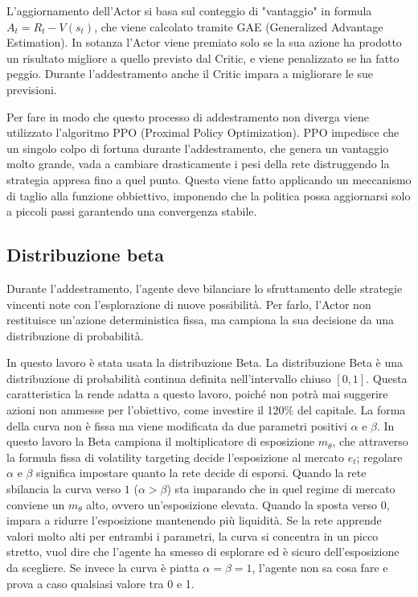 L'aggiornamento dell'Actor si basa sul conteggio di "vantaggio" in formula $A_t = R_t - V(s_t)$, che viene calcolato tramite GAE (Generalized Advantage Estimation).
In sotanza l'Actor viene premiato solo se la sua azione ha prodotto un risultato migliore a quello previsto dal Critic, e viene penalizzato se ha fatto peggio.
Durante l'addestramento anche il Critic impara a migliorare le sue previsioni.

Per fare in modo che questo processo di addestramento non diverga viene utilizzato l'algoritmo PPO (Proximal Policy Optimization). 
PPO impedisce che un singolo colpo di fortuna durante l'addestramento, che genera un vantaggio molto grande, vada a cambiare drasticamente i pesi della rete distruggendo la strategia appresa fino a quel punto.
Questo viene fatto applicando un meccanismo di taglio alla funzione obbiettivo, imponendo che la politica possa aggiornarsi solo a piccoli passi garantendo una convergenza stabile.

\subsection{Distribuzione beta}
Durante l'addestramento, l'agente deve bilanciare lo sfruttamento delle strategie vincenti note con l'esplorazione di nuove possibilità. Per farlo, l'Actor non restituisce un'azione deterministica fissa, ma campiona la sua decisione da una distribuzione di probabilità. 

In questo lavoro è stata usata la distribuzione Beta.
La distribuzione Beta è una distribuzione di probabilità continua definita nell'intervallo chiuso $[0,1]$.
Questa caratteristica la rende adatta a questo lavoro, poiché non potrà mai suggerire azioni non ammesse per l'obiettivo, come investire il 120\% del capitale.
La forma della curva non è fissa ma viene modificata da due parametri positivi $\alpha$ e $\beta$.
In questo lavoro la Beta campiona il moltiplicatore di esposizione $m_\theta$, che attraverso la formula fissa di volatility targeting decide l'esposizione al mercato $e_t$; regolare $\alpha$ e $\beta$ significa impostare quanto la rete decide di esporsi.
Quando la rete sbilancia la curva verso $1$ ($\alpha > \beta$) sta imparando che in quel regime di mercato conviene un $m_\theta$ alto, ovvero un'esposizione elevata. Quando la sposta verso $0$, impara a ridurre l'esposizione mantenendo più liquidità.
Se la rete apprende valori molto alti per entrambi i parametri, la curva si concentra in un picco stretto, vuol dire che l'agente ha smesso di esplorare ed è sicuro dell'esposizione da scegliere.
Se invece la curva è piatta $\alpha = \beta = 1$, l'agente non sa cosa fare e prova a caso qualsiasi valore tra 0 e 1.



